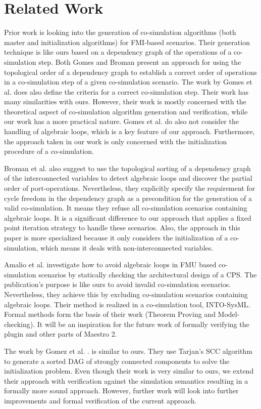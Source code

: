 \section{Related Work}
Prior work \cite{Gomes2019, BromanCompositionCo-Simulation} is looking into the generation of co-simulation algorithms (both master and initialization algorithms) for FMI-based scenarios. Their generation technique is like ours based on a dependency graph of the operations of a co-simulation step. Both Gomes and Broman present an approach for using the topological order of a dependency graph to establish a correct order of operations in a co-simulation step of a given co-simulation scenario.
The work by Gomes et al. \cite{Gomes2019} does also define the criteria for a correct co-simulation step. Their work has many similarities with ours. However, their work is mostly concerned with the theoretical aspect of co-simulation algorithm generation and verification, while our work has a more practical nature. Gomes et al. do also not consider the handling of algebraic loops, which is a key feature of our approach. Furthermore, the approach taken in our work is only concerned with the initialization procedure of a co-simulation.

Broman et al. \cite{BromanCompositionCo-Simulation} also suggest to use the topological sorting of a dependency graph of the interconnected variables to detect algebraic loops and discover the partial order of port-operations. Nevertheless, they explicitly specify the requirement for cycle freedom in the dependency graph as a precondition for the generation of a valid co-simulation. It means they refuse all co-simulation scenarios containing algebraic loops. It is a significant difference to our approach that applies a fixed point iteration strategy to handle these scenarios. Also, the approach in this paper is more specialized because it only considers the initialization of a co-simulation, which means it deals with non-interconnected variables.

Amalio et al. \cite{Amalio2016CheckingCo-simulation} investigate how to avoid algebraic loops in FMU based co-simulation scenarios by statically checking the architectural design of a CPS. The publication's purpose is like ours to avoid invalid co-simulation scenarios. Nevertheless, they achieve this by excluding co-simulation scenarios containing algebraic loops. Their method is realized in a co-simulation tool, INTO-SysML\cite{Miyazawa2016INtegratedModelling}. Formal methods form the basis of their work (Theorem Proving and Model-checking). It will be an inspiration for the future work of formally verifying the plugin and other parts of Maestro 2. 

The work by Gomez et al. .\cite{EvoraGomez2019a} is similar to ours. They use Tarjan's SCC algorithm to generate a sorted DAG of strongly connected components to solve the initialization problem.
Even though their work is very similar to ours, we extend their approach with verification against the simulation semantics resulting in a formally more sound approach. However, further work will look into further improvements and formal verification of the current approach.